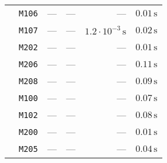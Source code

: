 \begin{tabular}{cc|rrrr}
 & \texttt{\footnotesize                 M106} &                             — &                             — &                             — & $             0.01\,\text{s}$\\
 & \texttt{\footnotesize                 M107} &                             — &                             — & $ 1.2\cdot 10^{-3}\,\text{s}$ & $             0.02\,\text{s}$\\
 & \texttt{\footnotesize                 M202} &                             — &                             — &                             — & $             0.01\,\text{s}$\\
 & \texttt{\footnotesize                 M206} &                             — &                             — &                             — & $             0.11\,\text{s}$\\
 & \texttt{\footnotesize                 M208} &                             — &                             — &                             — & $             0.09\,\text{s}$\\
 & \texttt{\footnotesize                 M100} &                             — &                             — &                             — & $             0.07\,\text{s}$\\
 & \texttt{\footnotesize                 M102} &                             — &                             — &                             — & $             0.08\,\text{s}$\\
 & \texttt{\footnotesize                 M200} &                             — &                             — &                             — & $             0.01\,\text{s}$\\
 & \texttt{\footnotesize                 M205} &                             — &                             — &                             — & $             0.04\,\text{s}$\\
\end{tabular}
